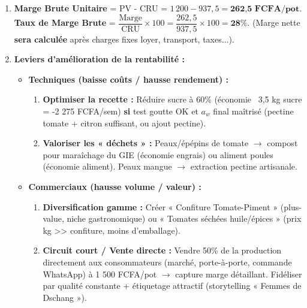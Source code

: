 \documentclass[11pt]{article}
\begin{document}
\begin{exoresolu}
\begin{enumerate}
    \item \textbf{Marge Brute Unitaire} = PV - CRU = $1\,200 - 937{,}5 = \textbf{262{,}5 FCFA/pot}$.
    \textbf{Taux de Marge Brute} = $\dfrac{\text{Marge}}{\text{CRU}} \times 100 = \dfrac{262{,}5}{937{,}5} \times 100 = \textbf{28\%}$.
    (Marge nette \textbf{sera calculée} après charges fixes loyer, transport, taxes...).
    \item \textbf{Leviers d'amélioration de la rentabilité :}
    \begin{itemize}
        \item \textbf{Techniques (baisse coûts / hausse rendement) :}
            \begin{enumerate}
                \item \textbf{Optimiser la recette :} Réduire sucre à 60\% (économie ~3,5 kg sucre = -2 275 FCFA/sem) \textbf{si} test goutte OK et $a_w$ final maîtrisé (pectine tomate + citron suffisant, ou ajout pectine).
                \item \textbf{Valoriser les « déchets » :} Peaux/épépins de tomate $\rightarrow$ compost pour maraîchage du GIE (économie engrais) ou aliment poules (économie aliment). Peaux mangue $\rightarrow$ extraction pectine artisanale.
            \end{enumerate}
        \item \textbf{Commerciaux (hausse volume / valeur) :}
            \begin{enumerate}
                \item \textbf{Diversification gamme :} Créer « Confiture Tomate-Piment » (plus-value, niche gastronomique) ou « Tomates séchées huile/épices » (prix kg >> confiture, moins d'emballage).
                \item \textbf{Circuit court / Vente directe :} Vendre 50\% de la production directement aux consommateurs (marché, porte-à-porte, commande WhatsApp) à 1 500 FCFA/pot $\rightarrow$ capture marge détaillant. Fidéliser par qualité constante + étiquetage attractif (storytelling « Femmes de Dschang »).
            \end{enumerate}
    \end{itemize}
\end{enumerate}
\end{exoresolu}
\end{document}
